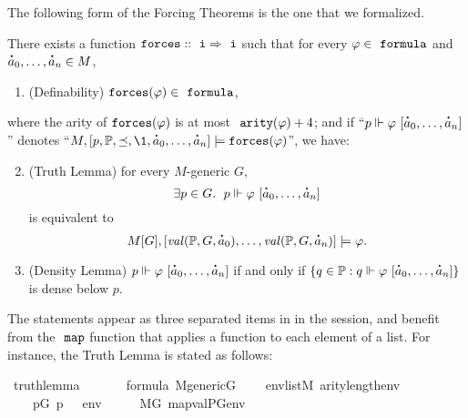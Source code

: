 The following form of the Forcing Theorems  is the one
that we formalized.
\begin{theorem}\label{th:forcing-thms}
  There exists a function  $\forceisa:: \tyi \fun  \tyi$
  such that for every
  $\phi\in\formula$ and $\punto{a}_0,\dots,\punto{a}_n\in M$,
  \begin{enumerate}
  \item\label{item:definability} (Definability)
    $\forceisa(\phi)\in\formula$, 
  \end{enumerate}
  where the 
  arity of $\mathop{\mathtt{forces}}(\varphi)$ is at most $\isatt{arity}(\phi) + 4$; and if
  “$p \forces \phi\ [\punto{a}_0,\dots,\punto{a}_n]$”
  denotes
  “$M, [p,\PP,\preceq,\1, \punto{a}_0,\dots,\punto{a}_n]  \models
  \forceisa(\phi)$”, we have:
  \begin{enumerate}
    \setcounter{enumi}{1}
  \item\label{item:truth-lemma} (Truth Lemma) for every $M$-generic $G$,
    \[
      \exists p\in G.\ \; p \forces \phi\ [\punto{a}_0,\dots,\punto{a}_n]
    \]
    is equivalent to 
    \[
      M[G], [\val(\PP,G,\punto{a}_0),\dots,\val(\PP,G,\punto{a}_n)]
      \models \phi.
    \]
  \item \label{item:density-lemma} (Density Lemma) $p \forces \phi\ [\punto{a}_0,\dots,\punto{a}_n]$
    if and only if 
    $\{q\in \PP :  q \forces \phi\ [\punto{a}_0,\dots,\punto{a}_n]\}$
    is dense below $p$.
  \end{enumerate}
\end{theorem}
The statements appear as three separated items in
 in the  session,
and benefit from the $\isatt{map}$ function that applies a function to
each element of a list. For instance, the Truth Lemma is stated as
follows:
\begin{isabelle}
\isamarkupfalse%
\ truth{\isacharunderscore}{\kern0pt}lemma{\isacharcolon}{\kern0pt}\isanewline
\ \ \isanewline
\ \ \ \ {\isachardoublequoteopen}{\isasymphi}{\isasymin}formula{\isachardoublequoteclose}\ {\isachardoublequoteopen}M{\isacharunderscore}{\kern0pt}generic{\isacharparenleft}{\kern0pt}G{\isacharparenright}{\kern0pt}{\isachardoublequoteclose}\isanewline
\ \ \ \ {\isachardoublequoteopen}env{\isasymin}list{\isacharparenleft}{\kern0pt}M{\isacharparenright}{\kern0pt}{\isachardoublequoteclose}\ {\isachardoublequoteopen}arity{\isacharparenleft}{\kern0pt}{\isasymphi}{\isacharparenright}{\kern0pt}{\isasymle}length{\isacharparenleft}{\kern0pt}env{\isacharparenright}{\kern0pt}{\isachardoublequoteclose}\isanewline
\ \ \isanewline
\ \ \ \ {\isachardoublequoteopen}{\isacharparenleft}{\kern0pt}{\isasymexists}p{\isasymin}G{\isachardot}{\kern0pt}\ p\ {\isasymtturnstile}\ {\isasymphi}\ env{\isacharparenright}{\kern0pt}\ \ \ {\isasymlongleftrightarrow}\ \ \ M{\isacharbrackleft}{\kern0pt}G{\isacharbrackright}{\kern0pt}{\isacharcomma}{\kern0pt}\ map{\isacharparenleft}{\kern0pt}val{\isacharparenleft}{\kern0pt}P{\isacharcomma}{\kern0pt}G{\isacharparenright}{\kern0pt}{\isacharcomma}{\kern0pt}env{\isacharparenright}{\kern0pt}\ {\isasymTurnstile}\ {\isasymphi}{\isachardoublequoteclose}
\end{isabelle}
